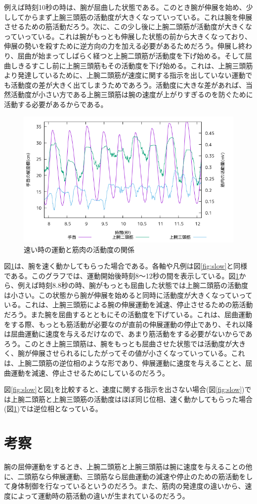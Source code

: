 \documentclass{jsarticle}
\begin{document}
例えば時刻10秒の時は、腕が屈曲した状態である。このとき腕が伸展を始め、少ししてからまず上腕三頭筋の活動度が大きくなっていっている。これは腕を伸展させるための筋活動だろう。次に、この少し後に上腕二頭筋が活動度が大きくなっていっている。これは腕がもっとも伸展した状態の前から大きくなっており、伸展の勢いを殺すために逆方向の力を加える必要があるためだろう。伸展し終わり、屈曲が始まってしばらく経つと上腕二頭筋が活動度を下げ始める。そして屈曲しきるすこし前に上腕三頭筋もその活動度を下げ始める。これは、上腕三頭筋より発達しているために、上腕二頭筋が速度に関する指示を出していない運動でも活動度の差が大きく出てしまうためであろう。活動度に大きな差があれば、当然活動度が小さい方である上腕三頭筋は腕の速度が上がりすぎるのを防ぐために活動する必要があるからである。

\begin{figure}[b]
  \begin{center}
    \includegraphics[width=15cm]{images/s2proto.png}
  \end{center}
  \caption{速い時の運動と筋肉の活動度の関係}
  \label{fig:fast}
\end{figure}
図\ref{fig:fast}は、腕を速く動かしてもらった場合である。各軸や凡例は図\ref{fig:slow}と同様である。このグラフでは、運動開始後時刻8〜12秒の間を表示している。図\ref{fig:fast}から、例えば時刻8.8秒の時、腕がもっとも屈曲した状態では上腕二頭筋の活動度は小さい。この状態から腕が伸展を始めると同時に活動度が大きくなっていっている。これは、上腕三頭筋による腕の伸展運動を減速、停止させるための筋活動だろう。また腕を屈曲するとともにその活動度を下げている。これは、屈曲運動をする際、もっとも筋活動が必要なのが直前の伸展運動の停止であり、それ以降は屈曲運動に速度を与えるだけなので、あまり筋活動をする必要がないからであろう。このとき上腕三頭筋は、腕をもっとも屈曲させた状態では活動度が大きく、腕が伸展させられるにしたがってその値が小さくなっていっている。これは、上腕二頭筋の逆位相のような形であり、伸展運動に速度を与えることと、屈曲運動を減速、停止させるためにしているのだろう。

図\ref{fig:slow}と図\ref{fig:fast}を比較すると、速度に関する指示を出さない場合(図\ref{fig:slow})では上腕二頭筋と上腕三頭筋の活動度はほぼ同じ位相、速く動かしてもらった場合(図\ref{fig:fast})では逆位相となっている。

\section{考察}
腕の屈伸運動をするとき、上腕二頭筋と上腕三頭筋は腕に速度を与えることの他に、二頭筋なら伸展運動、三頭筋なら屈曲運動の減速や停止のための筋活動をして身体制御を行なっているというのだろう。また、筋肉の発達度の違いから、速度によって運動時の筋活動の違いが生まれているのだろう。
\end{document}

